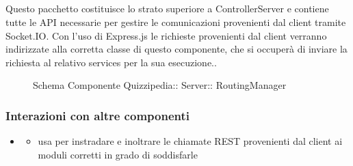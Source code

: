 \subsection{}
Questo pacchetto costituisce lo strato superiore a ControllerServer e contiene tutte le API necessarie per gestire le comunicazioni provenienti dal client tramite Socket.IO. 
Con l'uso di Express.js le richieste provenienti dal client verranno indirizzate alla corretta classe di questo componente, che si occuperà di inviare la richiesta al relativo services per la sua esecuzione..
\begin{figure}[H]
\centering
\noindent{}
\caption[Schema Componente RoutingManager]{Schema Componente Quizzipedia:: Server:: RoutingManager}
\end{figure}
\subsubsection{Interazioni con altre componenti}
\begin{itemize}
\item {}
\begin{itemize}
\item usa  per instradare e inoltrare le chiamate REST provenienti dal client ai moduli corretti in grado di soddisfarle
\end{itemize}
\end{itemize}
